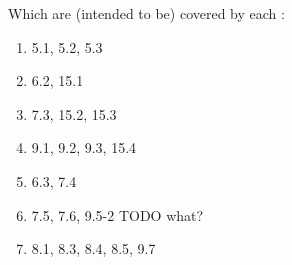 Which  are (intended to be) covered by each
:

\begin{enumerate}
  \item 5.1, 5.2, 5.3
  \item 6.2, 15.1
  \item 7.3, 15.2, 15.3
  \item 9.1, 9.2, 9.3, 15.4
  \item 6.3, 7.4
  \item 7.5, 7.6, 9.5-2 TODO what?
  \item 8.1, 8.3, 8.4, 8.5, 9.7
\end{enumerate}

